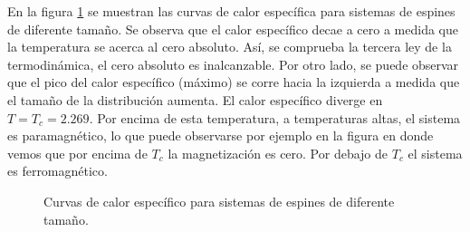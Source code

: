 \documentclass[a4paper,12pt]{article}
\begin{document}
       
       \noindent En la figura \ref{fig:cv} se muestran las curvas de calor específica para sistemas de espines de diferente tamaño. Se observa que el calor específico decae a cero a medida que la temperatura se acerca al cero absoluto. Así, se comprueba la tercera ley de la termodinámica,  el cero absoluto es inalcanzable. Por otro lado, se puede observar que el pico del calor específico (máximo) se corre hacia la izquierda a medida que el tamaño de la distribución aumenta. El calor específico diverge en $T = T_{c} = 2.269$. Por encima de esta temperatura, a temperaturas altas, el sistema es paramagnético, lo que puede observarse por ejemplo en la figura \label{fig:16x16magnetization} en donde vemos que por encima de $T_{c}$ la magnetización es cero. Por debajo de $T_{c}$ el sistema es ferromagnético.
       
        \begin{figure}[H]
         \centering
         \caption{Curvas de calor específico para sistemas de espines de diferente tamaño.}
         \label{fig:cv}
       \end{figure}

       
   \noindent 

   
   

\end{document}
